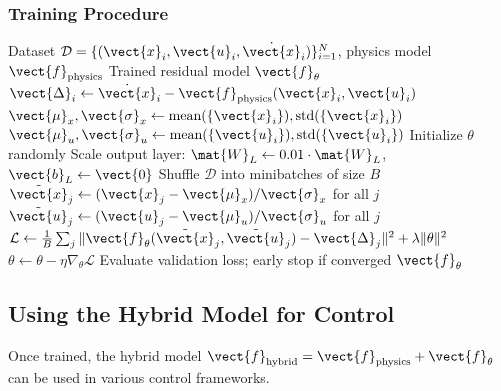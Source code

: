 \subsubsection{Training Procedure}

\begin{algorithm}[H]
\caption{Residual Dynamics Learning}
\label{alg:residual_learning}
\begin{algorithmic}[1]
\REQUIRE Dataset $\mathcal{D} = \{(\vect{x}_i, \vect{u}_i, \dot{\vect{x}}_i)\}_{i=1}^N$, physics model $\vect{f}_{\text{physics}}$
\ENSURE Trained residual model $\vect{f}_\theta$
\STATE {}
    \STATE $\vect{\Delta}_i \gets \dot{\vect{x}}_i - \vect{f}_{\text{physics}}(\vect{x}_i, \vect{u}_i)$
\ENDFOR
\STATE
\STATE {}
\STATE $\vect{\mu}_x, \vect{\sigma}_x \gets \text{mean}(\{\vect{x}_i\}), \text{std}(\{\vect{x}_i\})$
\STATE $\vect{\mu}_u, \vect{\sigma}_u \gets \text{mean}(\{\vect{u}_i\}), \text{std}(\{\vect{u}_i\})$
\STATE
\STATE {}
\STATE Initialize $\theta$ randomly
\STATE Scale output layer: $\mat{W}_L \gets 0.01 \cdot \mat{W}_L$, $\vect{b}_L \gets \vect{0}$
\STATE
\STATE {}
    \STATE Shuffle $\mathcal{D}$ into minibatches of size $B$
        \STATE $\tilde{\vect{x}}_j \gets (\vect{x}_j - \vect{\mu}_x) / \vect{\sigma}_x$ for all $j$
        \STATE $\tilde{\vect{u}}_j \gets (\vect{u}_j - \vect{\mu}_u) / \vect{\sigma}_u$ for all $j$
        \STATE $\mathcal{L} \gets \frac{1}{B}\sum_j \|\vect{f}_\theta(\tilde{\vect{x}}_j, \tilde{\vect{u}}_j) - \vect{\Delta}_j\|^2 + \lambda\|\theta\|^2$
        \STATE $\theta \gets \theta - \eta \nabla_\theta \mathcal{L}$ 
    \ENDFOR
    \STATE Evaluate validation loss; early stop if converged
\ENDFOR
\RETURN $\vect{f}_\theta$
\end{algorithmic}
\end{algorithm}

\subsection{Using the Hybrid Model for Control}

Once trained, the hybrid model $\vect{f}_{\text{hybrid}} = \vect{f}_{\text{physics}} + \vect{f}_\theta$ can be used in various control frameworks.

